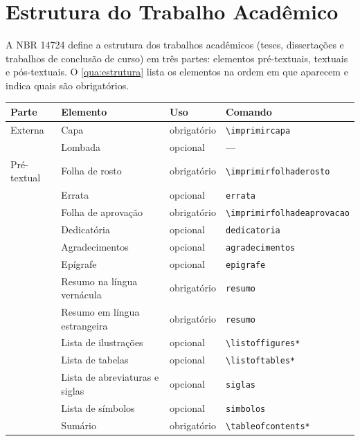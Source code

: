 \chapter{Estrutura do Trabalho Acadêmico}\label{cap:estrutura}

A NBR 14724 \cite{abnt14724} define a estrutura dos trabalhos acadêmicos (teses, dissertações e trabalhos de conclusão de curso) em três partes: elementos pré-textuais, textuais e pós-textuais. O \autoref{qua:estrutura} lista os elementos na ordem em que aparecem e indica quais são obrigatórios.

\begin{quadro}[htbp]
	\caption{Elementos do trabalho acadêmico}\label{qua:estrutura}
	\centering
	\footnotesize
	\begin{tabular}{p{}p{}p{}p{}}
		\toprule
		\textbf{Parte} & \textbf{Elemento} & \textbf{Uso} & \textbf{Comando} \\
		\midrule
		Externa & Capa & obrigatório & \verb|\imprimircapa| \\
		& Lombada & opcional & --- \\
		\midrule
		Pré-textual & Folha de rosto & obrigatório & \verb|\imprimirfolhaderosto| \\
		& Errata & opcional & \texttt{errata} \\
		& Folha de aprovação & obrigatório & \verb|\imprimirfolhadeaprovacao| \\
		& Dedicatória & opcional & \texttt{dedicatoria} \\
		& Agradecimentos & opcional & \texttt{agradecimentos} \\
		& Epígrafe & opcional & \texttt{epigrafe} \\
		& Resumo na língua vernácula & obrigatório & \texttt{resumo} \\
		& Resumo em língua estrangeira & obrigatório & \texttt{resumo} \\
		& Lista de ilustrações & opcional & \verb|\listoffigures*| \\
		& Lista de tabelas & opcional & \verb|\listoftables*| \\
		& Lista de abreviaturas e siglas & opcional & \texttt{siglas} \\
		& Lista de símbolos & opcional & \texttt{simbolos} \\
		& Sumário & obrigatório & \verb|\tableofcontents*| \\

\end{tabular}
\end{quadro}
